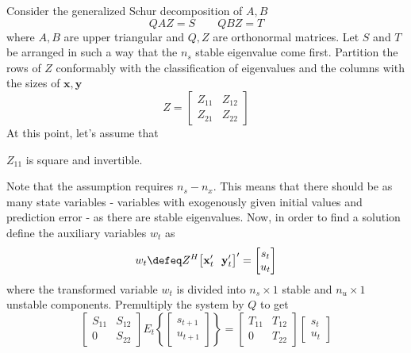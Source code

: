 \documentclass[a4paper,10pt]{article}  %
\begin{document}
Consider the generalized Schur decomposition of $ A, B $ 
\begin{equation}
   Q A Z = S \qquad Q B Z = T
\end{equation}
where $ A,B $ are upper triangular and $ Q,Z$ are orthonormal matrices. Let $ S $ and $ T $ be arranged in such a way
that the $ n_s $ stable eigenvalue come first. Partition the rows of $ Z $ conformably with the classification of
eigenvalues and the columns with the sizes of $ \mathbf{x},\mathbf{y} $
\begin{equation*}
   Z = 
   \begin{bmatrix}
      Z_{11} & Z_{12} \\ Z_{21} & Z_{22}
   \end{bmatrix}
\end{equation*}
At this point, let's assume that
\begin{assump}
   $ Z_{11} $ is square and invertible. 
\end{assump}
Note that the assumption requires $n_s - n_x$. This means that there should be as many state variables - variables with
exogenously given initial values and prediction error - as there are stable eigenvalues. Now, in order to find a
solution define the auxiliary variables $ w_t $ as
\begin{equation}
   \label{eq:aux}
   w_t \defeq Z^{H} \big[ \mathbf{x}_t' \ \  \mathbf{y}_t' \big]' =
   \begin{bmatrix}
      s_t \\ u_t
   \end{bmatrix}
\end{equation}
where the transformed variable $ w_t $ is divided into $ n_s\times 1 $ stable and $ n_u \times 1 $ unstable components. 
Premultiply the system by $ Q $ to get 
\begin{equation}
   \begin{bmatrix}
      S_{11} & S_{12} \\ 0 & S_{22}
   \end{bmatrix}
   E_t \left\{
   \begin{bmatrix}
      s_{t+1} \\ u_{t+1}
   \end{bmatrix} \right\}
    = 
    \begin{bmatrix}
       T_{11} & T_{12} \\ 0 & T_{22}
    \end{bmatrix}
    \begin{bmatrix}
      s_{t} \\ u_{t}
   \end{bmatrix}
\end{equation}
\end{document}
